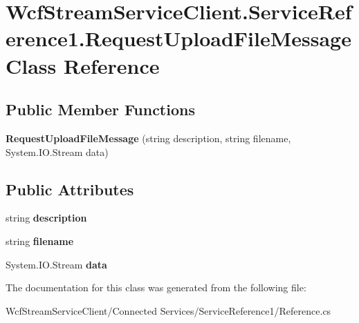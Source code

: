 \hypertarget{class_wcf_stream_service_client_1_1_service_reference1_1_1_request_upload_file_message}{}\section{Wcf\+Stream\+Service\+Client.\+Service\+Reference1.\+Request\+Upload\+File\+Message Class Reference}
\label{class_wcf_stream_service_client_1_1_service_reference1_1_1_request_upload_file_message}
\subsection*{Public Member Functions}
\begin{DoxyCompactItemize}
\item 
\mbox{\label{class_wcf_stream_service_client_1_1_service_reference1_1_1_request_upload_file_message_a6f34ac04e31aac9f84e5844f6eb3caba}} 
{\bfseries Request\+Upload\+File\+Message} (string description, string filename, System.\+I\+O.\+Stream data)
\end{DoxyCompactItemize}
\subsection*{Public Attributes}
\begin{DoxyCompactItemize}
\item 
\mbox{\label{class_wcf_stream_service_client_1_1_service_reference1_1_1_request_upload_file_message_a9775c1370b3cb024f92e15df1692f9d7}} 
string {\bfseries description}
\item 
\mbox{\label{class_wcf_stream_service_client_1_1_service_reference1_1_1_request_upload_file_message_a146fb6469f8645d0dc5c7e93f55d752f}} 
string {\bfseries filename}
\item 
\mbox{\label{class_wcf_stream_service_client_1_1_service_reference1_1_1_request_upload_file_message_a50ef89a54b54c0f38bc6a146efe9bb87}} 
System.\+I\+O.\+Stream {\bfseries data}
\end{DoxyCompactItemize}


The documentation for this class was generated from the following file\+:\begin{DoxyCompactItemize}
\item 
Wcf\+Stream\+Service\+Client/\+Connected Services/\+Service\+Reference1/Reference.\+cs\end{DoxyCompactItemize}
